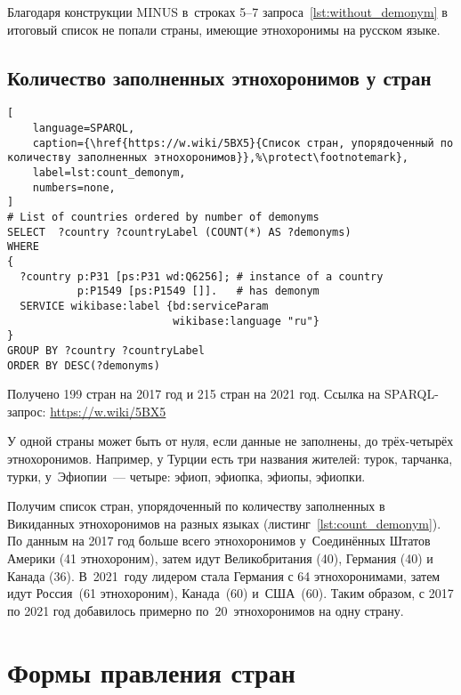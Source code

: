 Благодаря конструкции MINUS в~строках 5--7 запроса~\ref{lst:without_demonym} 
в итоговый список не попали страны, имеющие этнохоронимы на русском языке.





\subsection{Количество заполненных этнохоронимов у стран}
%
\begin{marginfigure}[-5\baselineskip]
\begin{lstlisting}[ 
    language=SPARQL, 
    caption={\href{https://w.wiki/5BX5}{Список стран, упорядоченный по количеству заполненных этнохоронимов}},%\protect\footnotemark},
    label=lst:count_demonym, 
    numbers=none,
]
# List of countries ordered by number of demonyms
SELECT  ?country ?countryLabel (COUNT(*) AS ?demonyms) 
WHERE
{
  ?country p:P31 [ps:P31 wd:Q6256]; # instance of a country
           p:P1549 [ps:P1549 []].   # has demonym
  SERVICE wikibase:label {bd:serviceParam 
                          wikibase:language "ru"}
}
GROUP BY ?country ?countryLabel 
ORDER BY DESC(?demonyms)
\end{lstlisting}
Получено 199 стран на 2017 год и 215 стран на 2021 год. Ссылка на SPARQL-запрос: \href{https://w.wiki/5BX5}{https://w.wiki/5BX5}
\end{marginfigure}%


У одной страны может быть от нуля, если данные не заполнены, до трёх-четырёх этнохоронимов. 
Например, у Турции есть три названия жителей: турок, тарчанка, турки, 
у~Эфиопии~--- четыре: эфиоп, эфиопка, эфиопы, эфиопки.

Получим список стран, упорядоченный по количеству заполненных в Викиданных этнохоронимов 
на разных языках (листинг~\ref{lst:count_demonym}). 
По данным на 2017 год больше всего этнохоронимов у~Соединённых Штатов Америки (41 этнохороним), 
затем идут Великобритания (40), 
Германия (40) и Канада (36). 
В~2021~году лидером стала Германия с 64 этнохоронимами, 
затем идут Россия~(61 этнохороним), Канада~(60) и~США~(60). 
Таким образом, с 2017 по 2021 год добавилось примерно по~20~этнохоронимов на одну страну.


\section{Формы правления стран}

